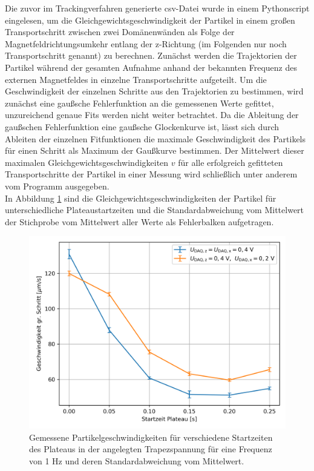 \documentclass[page,pdftex,12pt,a4paper,twoside,openright]{scrbook}
\begin{document}
Die zuvor im Trackingverfahren generierte csv-Datei wurde in einem Pythonscript \cite{holzinger_pythonscript_nodate-1} eingelesen, um die Gleichgewichtsgeschwindigkeit der Partikel in einem großen Transportschritt zwischen zwei Domänenwänden als Folge der Magnetfeldrichtungsumkehr entlang der z-Richtung (im Folgenden nur noch Transportschritt genannt) zu berechnen. Zunächst werden die Trajektorien der Partikel während der gesamten Aufnahme anhand der bekannten Frequenz des externen Magnetfeldes in einzelne Transportschritte aufgeteilt. Um die Geschwindigkeit der einzelnen Schritte aus den Trajektorien zu bestimmen, wird zunächst eine gaußsche Fehlerfunktion an die gemessenen Werte gefittet, unzureichend genaue Fits werden nicht weiter betrachtet. Da die Ableitung der gaußschen Fehlerfunktion eine gaußsche Glockenkurve ist, lässt sich durch Ableiten der einzelnen Fitfunktionen die maximale Geschwindigkeit des Partikels für einen Schritt als Maximum der Gaußkurve bestimmen. Der Mittelwert dieser maximalen Gleichgewichtsgeschwindigkeiten \(v\) für alle erfolgreich gefitteten Transportschritte der Partikel in einer Messung wird schließlich unter anderem vom Programm ausgegeben.\\

In Abbildung \ref{fig-img_v} sind die Gleichgewichtsgeschwindigkeiten der Partikel für unterschiedliche Plateaustartzeiten und die Standardabweichung vom Mittelwert der Stichprobe vom Mittelwert aller Werte als Fehlerbalken aufgetragen.\\

\begin{figure}[!h]
\centering
\includegraphics[width=.75\textwidth]{./img/v.png}
\caption{\label{fig-img_v}
Gemessene Partikelgeschwindigkeiten für verschiedene Startzeiten des Plateaus in der angelegten Trapezspannung für eine Frequenz von 1 Hz und deren Standardabweichung vom Mittelwert.}
\end{figure}
\end{document}
